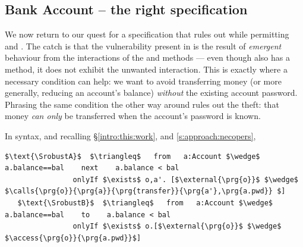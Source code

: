  \subsection{Bank Account -- the right specification}
\label{s:bankSpecEx}

We now {return to our quest for} a specification that rules out \ModB while permitting \ModA and
\ModC. The catch is that the vulnerability present in \ModB is the result
of  \emph{emergent} behaviour from the interactions of the 
and  methods --- even though \ModC also has a
 method, it does not exhibit the unwanted interaction.
This is exactly where a necessary condition can help:
we want to avoid transferring money
(or more generally, reducing an account's balance)
\textit{without} the existing account password.  Phrasing the same condition
the other way around %
rules out the theft: that money \textit{can only} be
transferred when the account's password is known.


In \Nec  syntax, and {recalling \S \ref{intro:this:work}, and \ref{s:approach:necopers},}
 

%
%
%
%
%
%
\begin{lstlisting}[language = Chainmail, mathescape=true,xleftmargin=2em,frame=lines,framexleftmargin=1.5em]
   $\text{\SrobustA}$  $\triangleq$   from   a:Account $\wedge$ a.balance==bal    next    a.balance < bal
                onlyIf $\exists$ o,a'. [$\external{\prg{o}}$ $\wedge$ $\calls{\prg{o}}{\prg{a}}{\prg{transfer}}{\prg{a'},\prg{a.pwd}} $]                   
   $\text{\SrobustB}$  $\triangleq$   from   a:Account $\wedge$ a.balance==bal    to    a.balance < bal
                onlyIf $\exists$ o.[$\external{\prg{o}}$ $\wedge$ $\access{\prg{o}}{\prg{a.pwd}}$]    
           
\end{lstlisting}
%
%
% 

